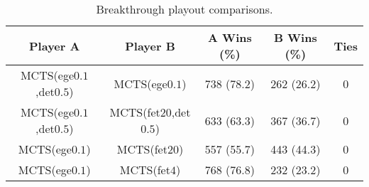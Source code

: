 \documentclass{article}
\begin{document}
\begin{table}[h!]
\begin{center}
\begin{tabular}{|c|c|ccc|}
\hline
Player A & Player B                             & A Wins (\%)  & B Wins (\%)  & Ties \\ 
\hline
MCTS(ege$0.1$,det$0.5$) & MCTS(ege$0.1$)        & 738 (78.2)   & 262 (26.2)   & 0    \\
MCTS(ege$0.1$,det$0.5$) & MCTS(fet$20$,det$0.5$) & 633 (63.3)   & 367 (36.7)   & 0    \\
MCTS(ege$0.1$)          & MCTS(fet$20$)          & 557 (55.7)   & 443 (44.3)   & 0    \\
MCTS(ege$0.1$)          & MCTS(fet$4$)           & 768 (76.8)   & 232 (23.2)   & 0    \\
\hline
\end{tabular}
\end{center}
\caption{Breakthrough playout comparisons.}
\end{table}
\end{document}
